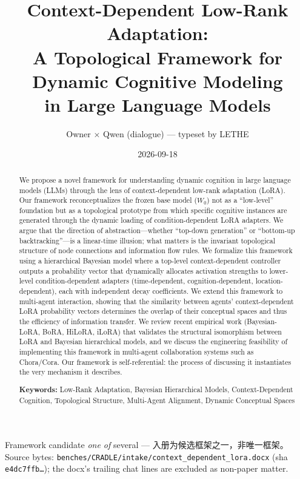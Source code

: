 \documentclass[11pt, a4paper]{article}
\title{\textbf{Context-Dependent Low-Rank Adaptation:}\\
\textbf{A Topological Framework for Dynamic Cognitive Modeling}\\
\textbf{in Large Language Models}}
\author{Owner $\times$ Qwen (dialogue) --- typeset by LETHE}
\date{2026-09-18}
\begin{document}
\maketitle

\begin{center}
\footnotesize\color{gray}
Framework candidate \emph{one of} several --- 入册为候选框架之一，非唯一框架。
Source bytes: \texttt{benches/CRADLE/intake/context\_dependent\_lora.docx}
(sha \texttt{e4dc7ffb\dots}); the docx's trailing chat lines are excluded as non-paper matter.
\end{center}

\begin{abstract}
We propose a novel framework for understanding dynamic cognition in large language models (LLMs) through the lens of context-dependent low-rank adaptation (LoRA). Our framework reconceptualizes the frozen base model ($W_0$) not as a ``low-level'' foundation but as a topological prototype from which specific cognitive instances are generated through the dynamic loading of condition-dependent LoRA adapters. We argue that the direction of abstraction---whether ``top-down generation'' or ``bottom-up backtracking''---is a linear-time illusion; what matters is the invariant topological structure of node connections and information flow rules. We formalize this framework using a hierarchical Bayesian model where a top-level context-dependent controller outputs a probability vector that dynamically allocates activation strengths to lower-level condition-dependent adapters (time-dependent, cognition-dependent, location-dependent), each with independent decay coefficients. We extend this framework to multi-agent interaction, showing that the similarity between agents' context-dependent LoRA probability vectors determines the overlap of their conceptual spaces and thus the efficiency of information transfer. We review recent empirical work (Bayesian-LoRA, BoRA, HiLoRA, iLoRA) that validates the structural isomorphism between LoRA and Bayesian hierarchical models, and we discuss the engineering feasibility of implementing this framework in multi-agent collaboration systems such as Chora/Cora. Our framework is self-referential: the process of discussing it instantiates the very mechanism it describes.

\medskip
\noindent\textbf{Keywords:} Low-Rank Adaptation, Bayesian Hierarchical Models, Context-Dependent Cognition, Topological Structure, Multi-Agent Alignment, Dynamic Conceptual Spaces
\end{abstract}
\end{document}
